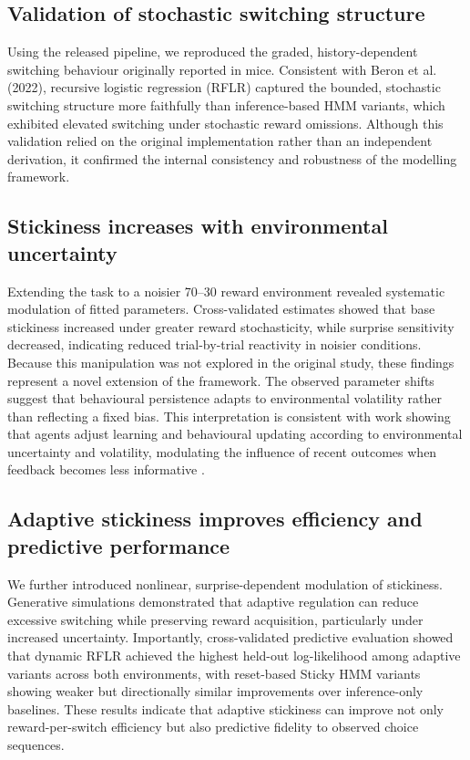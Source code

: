 \documentclass[11pt, reprint, aps, prl]{revtex4-2}
\begin{document}
\subsection{Validation of stochastic switching structure}
Using the released pipeline, we reproduced the graded, history-dependent switching behaviour originally reported in mice. Consistent with Beron et al. (2022), recursive logistic regression (RFLR) captured the bounded, stochastic switching structure more faithfully than inference-based HMM variants, which exhibited elevated switching under stochastic reward omissions. Although this validation relied on the original implementation rather than an independent derivation, it confirmed the internal consistency and robustness of the modelling framework.

\subsection{Stickiness increases with environmental uncertainty}
Extending the task to a noisier 70--30 reward environment revealed systematic modulation of fitted parameters. Cross-validated estimates showed that base stickiness increased under greater reward stochasticity, while surprise sensitivity decreased, indicating reduced trial-by-trial reactivity in noisier conditions. Because this manipulation was not explored in the original study, these findings represent a novel extension of the framework. The observed parameter shifts suggest that behavioural persistence adapts to environmental volatility rather than reflecting a fixed bias. This interpretation is consistent with work showing that agents adjust learning and behavioural updating according to environmental uncertainty and volatility, modulating the influence of recent outcomes when feedback becomes less informative \cite{Behrens2007,Nassar2010}.

\subsection{Adaptive stickiness improves efficiency and predictive performance}
We further introduced nonlinear, surprise-dependent modulation of stickiness. Generative simulations demonstrated that adaptive regulation can reduce excessive switching while preserving reward acquisition, particularly under increased uncertainty. Importantly, cross-validated predictive evaluation showed that dynamic RFLR achieved the highest held-out log-likelihood among adaptive variants across both environments, with reset-based Sticky HMM variants showing weaker but directionally similar improvements over inference-only baselines. These results indicate that adaptive stickiness can improve not only reward-per-switch efficiency but also predictive fidelity to observed choice sequences.
\end{document}
